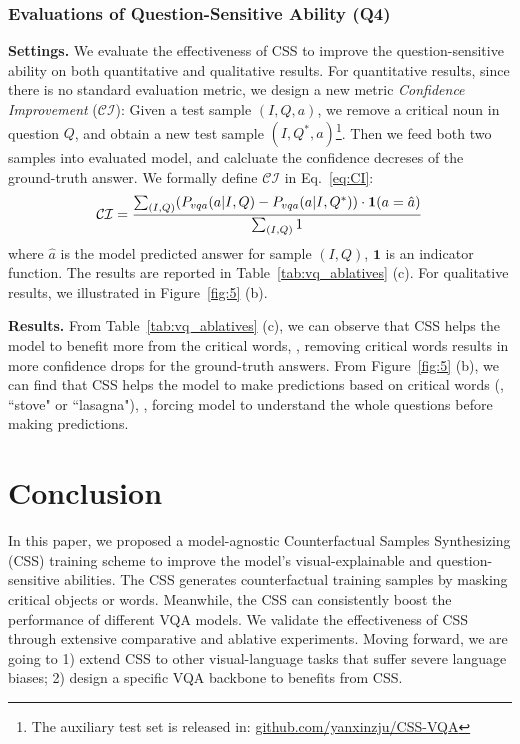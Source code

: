 \documentclass[10pt,twocolumn,letterpaper]{article}
\begin{document}
\subsubsection{Evaluations of Question-Sensitive Ability (Q4)}

\noindent\textbf{Settings.} We evaluate the effectiveness of CSS to improve the question-sensitive ability on both quantitative and qualitative results. For quantitative results, since there is no standard evaluation metric, we design a new metric \emph{Confidence Improvement} ($\mathcal{CI}$): Given a test sample $(I, Q, a)$, we remove a critical noun in question $Q$, and obtain a new test sample $(I, Q^*, a)$\footnote{The auxiliary test set is released in: \href{https://github.com/yanxinzju/CSS-VQA}{github.com/yanxinzju/CSS-VQA}}. Then we feed both two samples into evaluated model, and calcluate the confidence decreses of the ground-truth answer. We formally define $\mathcal{CI}$ in Eq.~\ref{eq:CI}:
\begin{equation} \label{eq:CI}
\small
\mathcal{CI} = \frac{\sum_{(I, Q)}  (P_{vqa}(a | I, Q) - P_{vqa}(a | I, Q^*)) \cdot \mathbf{1}(a = \hat{a}) }{\sum_{(I, Q)} 1}
\end{equation}
where $\hat{a}$ is the model predicted answer for sample $(I, Q)$, $\mathbf{1}$ is an indicator function. The results are reported in Table~\ref{tab:vq_ablatives} (c). For qualitative results, we illustrated in Figure~\ref{fig:5} (b).

\noindent\textbf{Results.} From Table~\ref{tab:vq_ablatives} (c), we can observe that CSS helps the model to benefit more from the critical words, \ie, removing critical words results in more confidence drops for the ground-truth answers. From Figure~\ref{fig:5} (b), we can find that CSS helps the model to make predictions based on critical words (\eg, ``stove" or ``lasagna"), \ie, forcing model to understand the whole questions before making predictions.


\section{Conclusion}
In this paper, we proposed a model-agnostic Counterfactual Samples Synthesizing (CSS) training scheme to improve the model's visual-explainable and question-sensitive abilities. The CSS generates counterfactual training samples by masking critical objects or words. Meanwhile, the CSS can consistently boost the performance of different VQA models. We validate the effectiveness of CSS through extensive comparative and ablative experiments. Moving forward, we are going to 1) extend CSS to other visual-language tasks that suffer severe language biases; 2) design a specific VQA backbone to benefits from CSS.
\end{document}

